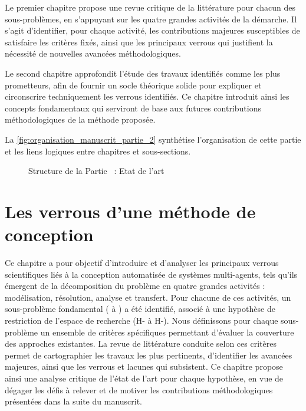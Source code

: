 Le premier chapitre propose une revue critique de la littérature pour chacun des sous-problèmes, en s’appuyant sur les quatre grandes activités de la démarche. Il s’agit d’identifier, pour chaque activité, les contributions majeures susceptibles de satisfaire les critères fixés, ainsi que les principaux verrous qui justifient la nécessité de nouvelles avancées méthodologiques.

Le second chapitre approfondit l’étude des travaux identifiés comme les plus prometteurs, afin de fournir un socle théorique solide pour expliquer et circonscrire techniquement les verrous identifiés. Ce chapitre introduit ainsi les concepts fondamentaux qui serviront de base aux futures contributions méthodologiques de la méthode proposée.

La \autoref{fig:organisation_manuscrit_partie_2} synthétise l’organisation de cette partie et les liens logiques entre chapitres et sous-sections.


\begin{figure}[h!]
  \centering
  \resizebox{\textwidth}{!}{%
    
  }
  \caption{Structure de la Partie ~: Etat de l'art}
  \label{fig:organisation_manuscrit_partie_2}
\end{figure}

\clearpage
\thispagestyle{empty}
\null
\newpage


\chapter{Les verrous d'une méthode de conception}
\label{chap:verrous}

\noindent
Ce chapitre a pour objectif d’introduire et d’analyser les principaux verrous scientifiques liés à la conception automatisée de systèmes multi-agents, tels qu’ils émergent de la décomposition du problème en quatre grandes activités : modélisation, résolution, analyse et transfert. Pour chacune de ces activités, un sous-problème fondamental ( à ) a été identifié, associé à une hypothèse de restriction de l’espace de recherche (H- à H-). Nous définissons pour chaque sous-problème un ensemble de critères spécifiques permettant d’évaluer la couverture des approches existantes. La revue de littérature conduite selon ces critères permet de cartographier les travaux les plus pertinents, d’identifier les avancées majeures, ainsi que les verrous et lacunes qui subsistent. Ce chapitre propose ainsi une analyse critique de l’état de l’art pour chaque hypothèse, en vue de dégager les défis à relever et de motiver les contributions méthodologiques présentées dans la suite du manuscrit.

